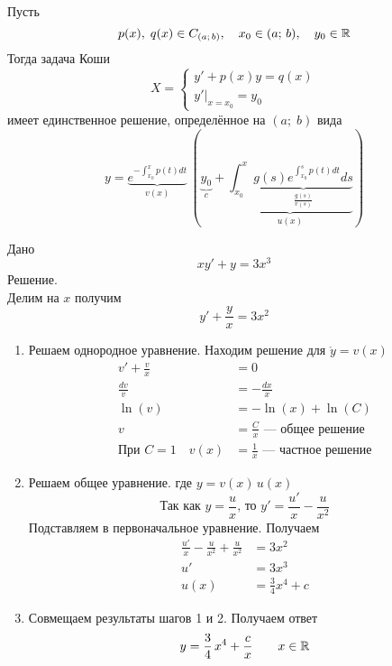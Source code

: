 \begin{Note}
    Пусть 
    \[
        p(x),\; q(x)\in C_{(a;\,b)}, \quad x_0 \in (a;\,b), \quad y_0 \in \mathbb{R}
    \]
    Тогда задача Коши\\
    \[
        X = \begin{cases}
            y'+p(x)y=q(x) \\
            y'|_{x=x_0}=y_0
        \end{cases}
    \]
    имеет единственное решение, определённое на $(a;\;b)$ вида\\
    \[
        y=\underbrace{e^{-\int_{x_0}^{x} p(t)dt}}_{v(x)}\,\left(\underbrace{y_0}_{c}+\underbrace{\int_{x_0}^{x}\underbrace{g(s)e^{\int_{x_0}^{s} p(t)dt}ds}_{\frac{g(s)}{v(s)}}}_{u(x)}\right)
    \]
\end{Note}

\begin{Example}
    Дано
    \[
        xy'+y=3x^3
    \]
    Решение.\\
    Делим на $x$ получим
    \[
        y'+\frac{y}{x}=3x^2
    \]
    \begin{enumerate}
        \item Решаем однородное уравнение. Находим решение для $\mathring{y} = v(x)$
        \begin{align*}
            v'+\frac{v}{x}&=0\\
            \frac{dv}{v}&=-\frac{dx}{x}\\
            \ln(v)&=-\ln(x)+\ln(C)\\
            v&=\frac{C}{x} \text{ --- общее решение}\\
            \text{При } C=1 \quad v(x)&=\frac{1}{x} \text{ --- частное решение}
        \end{align*}
        
        \item Решаем общее уравнение. где $y = v(x)\,u(x)$ 
        \[
            \text{Так как } y=\frac{u}{x} \text{, то } y'=\frac{u'}{x} - \frac{u}{x^2}
        \]
        Подставляем в первоначальное уравнение. Получаем
        \begin{align*}
            \frac{u'}{x} - \frac{u}{x^2}+\frac{u}{x^2}&=3x^2\\
            u'&=3x^3\\
            u(x)&=\frac{3}{4}x^4+c
        \end{align*}

        \item Совмещаем результаты шагов 1 и 2. Получаем ответ
        \[
            y=\frac{3}{4}\,x^4+\frac{c}{x} \qquad x\in \mathbb{R}
        \]
    \end{enumerate}
\end{Example}

